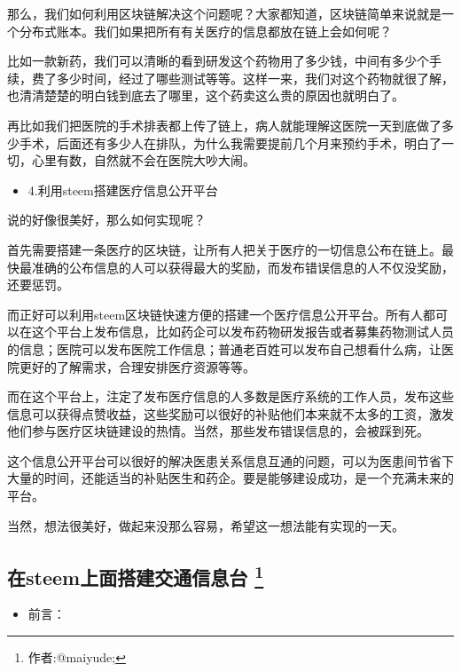 \documentclass[]{ctexbook}
\providecommand{\tightlist}{%
  \setlength{\itemsep}{0pt}\setlength{\parskip}{0pt}}
\begin{document}
那么，我们如何利用区块链解决这个问题呢？大家都知道，区块链简单来说就是一个分布式账本。我们如果把所有有关医疗的信息都放在链上会如何呢？

比如一款新药，我们可以清晰的看到研发这个药物用了多少钱，中间有多少个手续，费了多少时间，经过了哪些测试等等。这样一来，我们对这个药物就很了解，也清清楚楚的明白钱到底去了哪里，这个药卖这么贵的原因也就明白了。

再比如我们把医院的手术排表都上传了链上，病人就能理解这医院一天到底做了多少手术，后面还有多少人在排队，为什么我需要提前几个月来预约手术，明白了一切，心里有数，自然就不会在医院大吵大闹。

\begin{itemize}
\tightlist
\item
  4.利用steem搭建医疗信息公开平台
\end{itemize}

说的好像很美好，那么如何实现呢？

首先需要搭建一条医疗的区块链，让所有人把关于医疗的一切信息公布在链上。最快最准确的公布信息的人可以获得最大的奖励，而发布错误信息的人不仅没奖励，还要惩罚。

而正好可以利用steem区块链快速方便的搭建一个医疗信息公开平台。所有人都可以在这个平台上发布信息，比如药企可以发布药物研发报告或者募集药物测试人员的信息；医院可以发布医院工作信息；普通老百姓可以发布自己想看什么病，让医院更好的了解需求，合理安排医疗资源等等。

而在这个平台上，注定了发布医疗信息的人多数是医疗系统的工作人员，发布这些信息可以获得点赞收益，这些奖励可以很好的补贴他们本来就不太多的工资，激发他们参与医疗区块链建设的热情。当然，那些发布错误信息的，会被踩到死。

这个信息公开平台可以很好的解决医患关系信息互通的问题，可以为医患间节省下大量的时间，还能适当的补贴医生和药企。要是能够建设成功，是一个充满未来的平台。

当然，想法很美好，做起来没那么容易，希望这一想法能有实现的一天。

\hypertarget{dev-traffic-center}{%
\subsection[在steem上面搭建交通信息台 ]{\texorpdfstring{在steem上面搭建交通信息台 \footnote{作者:@maiyude;}}{在steem上面搭建交通信息台 }}\label{dev-traffic-center}}

\begin{itemize}
\tightlist
\item
  前言：
\end{itemize}
\end{document}
